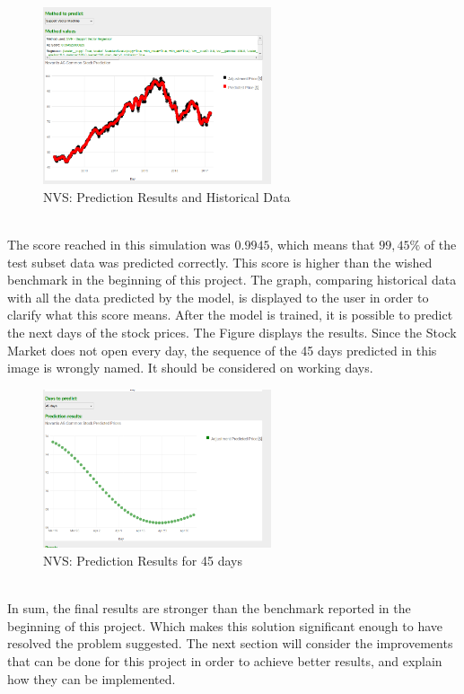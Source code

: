 \begin{figure}[H]
\centering
\includegraphics[width=0.6\textwidth]{figures/predict_svr.png}
\caption{NVS: Prediction Results and Historical Data}
\label{fig:predict_svr}
\end{figure}
\ \\

The score reached in this simulation was $0.9945$, which means that $99,45\%$ of the test subset data was predicted correctly. 
This score is higher than the wished benchmark in the beginning of this project. The graph, comparing historical data with all the data predicted by the model, 
is displayed to the user in order to clarify what this score means. After the model is trained, it is possible to predict the next days of the stock prices. 
The Figure \label{fig:predict_45days} displays the results. Since the Stock Market does not open every day, the sequence of the 45 days predicted in this image is wrongly named. 
It should be considered on working days. 

\begin{figure}[H]
\centering
\includegraphics[width=0.6\textwidth]{figures/predict_45days.png}
\caption{NVS: Prediction Results for 45 days}
\label{fig:predict_45days}
\end{figure}
\ \\

In sum, the final results are stronger than the benchmark reported in the beginning of this project. 
Which makes this solution significant enough to have resolved the problem suggested. 
The next section will consider the improvements that can be done for this project in order to achieve better results, 
and explain how they can be implemented. \\